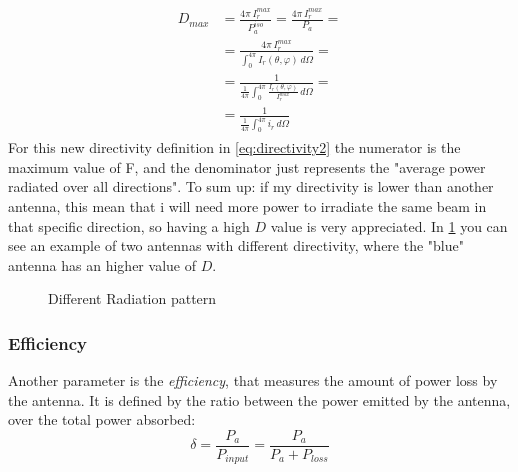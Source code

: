 \begin{align}\label{eq:directivity2}
    \begin{split}
        D_{max}&=\frac{4\pi\,I_r^{max}}{P_a^{iso}}=\frac{4\pi\,I_r^{max}}{P_a}=\\[5pt]
        &=\frac{4\pi\,I_r^{max}}{\int_0^{4\pi}I_r(\theta,\varphi)\,d\Omega}=\\[5pt]
        &=\frac{1}{\frac{1}{4\pi}\int_0^{4\pi}\frac{I_r(\theta,\varphi)}{I_r^{max}}\,d\Omega}=\\[5pt]
        &=\frac{1}{\frac{1}{4\pi}\int_0^{4\pi}i_r\,d\Omega}
    \end{split}
\end{align}
For this new directivity definition in \cref{eq:directivity2} the numerator is the maximum value of F, and the denominator just represents the "average power radiated over all directions".
To sum up: if my directivity is lower than another antenna, this mean that i will need more power to irradiate the same beam in that specific direction, so having a high $D$ value is very appreciated. In \cref{fig:different_radiation_pattern} you can see an example of two antennas with different directivity, where the "blue" antenna has an higher value of $D$.
\begin{figure}[H]
\begin{center}
\end{center} \caption{Different Radiation pattern}\label{fig:different_radiation_pattern} 
\end{figure}
\subsubsection*{Efficiency}
Another parameter is the \emph{efficiency}, that measures the amount of power loss by the antenna. It is defined by the ratio between the power emitted by the antenna, over the total power absorbed:
\begin{equation}\label{eq:atenna_efficency}
    \delta=\frac{P_a}{P_{input}}=\frac{P_a}{P_a+P_{loss}}
\end{equation}
